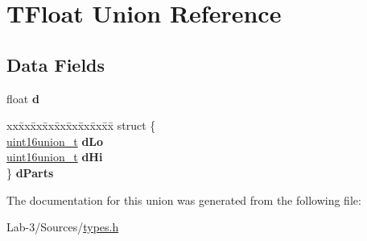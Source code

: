 \hypertarget{union_t_float}{}\section{T\+Float Union Reference}
\label{union_t_float}
\subsection*{Data Fields}
\begin{DoxyCompactItemize}
\item 
\mbox{\label{union_t_float_a3fbbd8a3959e76a2bc3455d3bade52dc}} 
float {\bfseries d}
\item 
\mbox{\label{union_t_float_a976430307579c440b03ee614d4b34d90}} 
\begin{tabbing}
xx\=xx\=xx\=xx\=xx\=xx\=xx\=xx\=xx\=\kill
struct \{\\
\>\hyperlink{unionuint16union__t}{uint16union\_t} {\bfseries dLo}\\
\>\hyperlink{unionuint16union__t}{uint16union\_t} {\bfseries dHi}\\
\} {\bfseries dParts}\\

\end{tabbing}\end{DoxyCompactItemize}


The documentation for this union was generated from the following file\+:\begin{DoxyCompactItemize}
\item 
Lab-\/3/\+Sources/\hyperlink{types_8h}{types.\+h}\end{DoxyCompactItemize}
